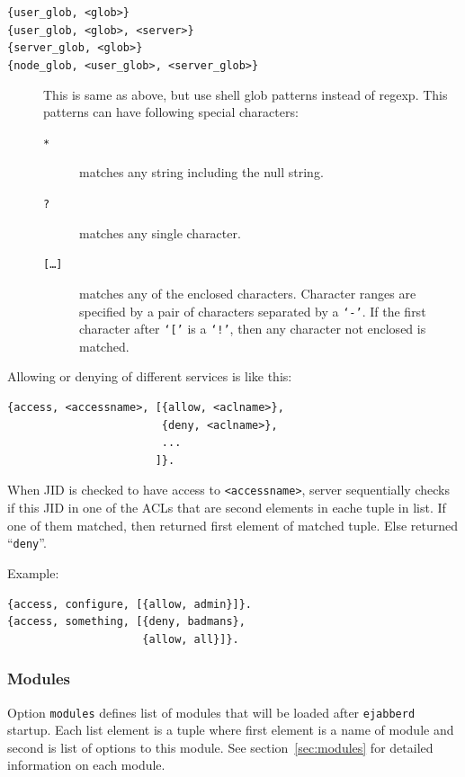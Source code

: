 \documentclass[10pt]{article}
\newcommand{\ejabberd}{\texttt{ejabberd}}
\begin{document}
\begin{description}
\item[\texttt{\{user\_glob, <glob>\}}]
\item[\texttt{\{user\_glob, <glob>, <server>\}}]
\item[\texttt{\{server\_glob, <glob>\}}]
\item[\texttt{\{node\_glob, <user\_glob>, <server\_glob>\}}] This is same as
  above, but use shell glob patterns instead of regexp.  This patterns can have
  following special characters:
  \begin{description}
  \item[\texttt{*}] matches any string including the null string.
  \item[\texttt{?}] matches any single character.
  \item[\texttt{[\ldots{}]}] matches any of the enclosed characters.  Character
    ranges are specified by a pair of characters separated by a \texttt{`-'}.
    If the first character after \texttt{`['} is a \texttt{`!'}, then any
    character not enclosed is matched.
  \end{description}
\end{description}

Allowing or denying of different services is like this:
\begin{verbatim}
{access, <accessname>, [{allow, <aclname>},
                        {deny, <aclname>},
                        ...
                       ]}.
\end{verbatim}
When JID is checked to have access to \texttt{<accessname>}, server
sequentially checks if this JID in one of the ACLs that are second elements in
eache tuple in list.  If one of them matched, then returned first element of
matched tuple.  Else returned ``\texttt{deny}''.

Example:
\begin{verbatim}
{access, configure, [{allow, admin}]}.
{access, something, [{deny, badmans},
                     {allow, all}]}.
\end{verbatim}



\subsubsection{Modules}
\label{sec:configmodules}

Option \texttt{modules} defines list of modules that will be loaded after
\ejabberd{} startup.  Each list element is a tuple where first element is a
name of module and second is list of options to this module.  See
section~\ref{sec:modules} for detailed information on each module.
\end{document}
